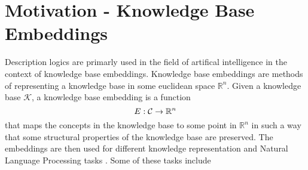 \section{Motivation - Knowledge Base Embeddings}

Description logics are primarly used in the field of artifical intelligence in the context of knowledge base embeddings.
Knowledge base embeddings are methods of representing a knowledge base in some euclidean space $\mathbb{R}^n$.
Given a knowledge base $\mathcal{K}$, a knowledge base embedding is a function
\[
    E : \mathcal{C} \rightarrow \mathbb{R}^n
\]
that maps the concepts in the knowledge base to some point in $\mathbb{R}^n$ 
in such a way that some structural properties of the knowledge base are preserved. The embeddings are then used
for different knowledge representation and Natural Language Processing tasks \cite{SurveryKG}.
Some of these tasks include
